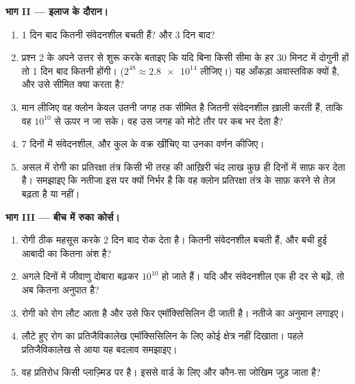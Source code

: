 \begin{problem}
\medskip
\noindent\textbf{भाग II --- इलाज के दौरान।}
\begin{enumerate}[resume]
  \item 1 दिन बाद कितनी संवेदनशील  बचती हैं? और 3 दिन बाद?
  \item प्रश्न 2 के अपने उत्तर से शुरू करके बताइए कि यदि 
         बिना किसी सीमा के हर 30 मिनट में दोगुनी हों तो 1 दिन बाद
        कितनी होंगी। ($2^{48} \approx \num{2.8e14}$ लीजिए।) यह आँकड़ा
        अवास्तविक क्यों है, और उसे सीमित क्या करता है?
  \item मान लीजिए वह  क्लोन केवल उतनी जगह तक सीमित है जितनी
        संवेदनशील  ख़ाली करती हैं, ताकि वह $10^{10}$ से ऊपर न जा
        सके। वह उस जगह को मोटे तौर पर कब भर देता है?
  \item 7 दिनों में संवेदनशील,  और कुल  के वक्र खींचिए या
        उनका वर्णन कीजिए।
  \item असल में रोगी का प्रतिरक्षा तंत्र किसी भी तरह की आख़िरी चंद लाख
         कुछ ही दिनों में साफ़ कर देता है। समझाइए कि नतीजा इस पर
        क्यों निर्भर है कि वह  क्लोन प्रतिरक्षा तंत्र के साफ़
        करने से तेज़ बढ़ता है या नहीं।
\end{enumerate}

\medskip
\noindent\textbf{भाग III --- बीच में रुका कोर्स।}
\begin{enumerate}[resume]
  \item रोगी ठीक महसूस करके 2 दिन बाद रोक देता है। कितनी संवेदनशील
         बचती हैं, और बची हुई आबादी का कितना अंश  है?
  \item अगले दिनों में जीवाणु दोबारा बढ़कर $10^{10}$ हो जाते हैं। यदि
         और संवेदनशील  एक ही दर से बढ़ें, तो अब कितना
        अनुपात  है?
  \item रोगी को रोग लौट आता है और उसे फिर एमॉक्सिसिलिन दी जाती है। नतीजे
        का अनुमान लगाइए।
  \item लौटे हुए रोग का प्रतिजैविकालेख एमॉक्सिसिलिन के लिए कोई क्षेत्र
        नहीं दिखाता। पहले प्रतिजैविकालेख से आया यह बदलाव समझाइए।
  \item वह प्रतिरोध  किसी प्लाज़्मिड पर है। इससे वार्ड के लिए और
        कौन-सा जोखिम जुड़ जाता है?
\end{enumerate}


\end{problem}
